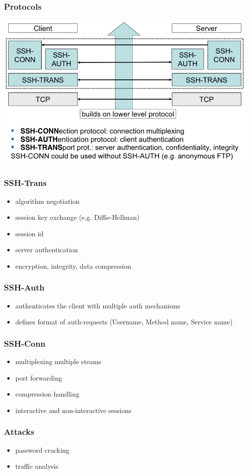 \documentclass[english, leagacyboxes, nologo]{latex4ei/latex4ei_sheet}
\begin{document}
{  \subsubsection{Protocols}
  \includegraphics[width=\columnwidth]{img/sshproto.png}

  \subsubsection{SSH-Trans}
  \begin{itemize}
  \item algorithm negotiation
  \item session key exchange (e.g. Diffie-Hellman)
  \item session id
  \item server authentication
  \item encryption, integrity, data compression
  \end{itemize}

  \subsubsection{SSH-Auth}
  \begin{itemize}
  \item authenticates the client with multiple auth mechanisms
  \item defines format of auth-requests (Username, Method name, Service name)
  \end{itemize}

  \subsubsection{SSH-Conn}
  \begin{itemize}
  \item multiplexing multiple steams
  \item port forwarding
  \item compression handling
  \item interactive and non-interactive sessions
  \end{itemize}


  \subsubsection{Attacks}
  \begin{itemize}
  \item password cracking
  \item traffic analysis
  \end{itemize}
  }
\end{document}
